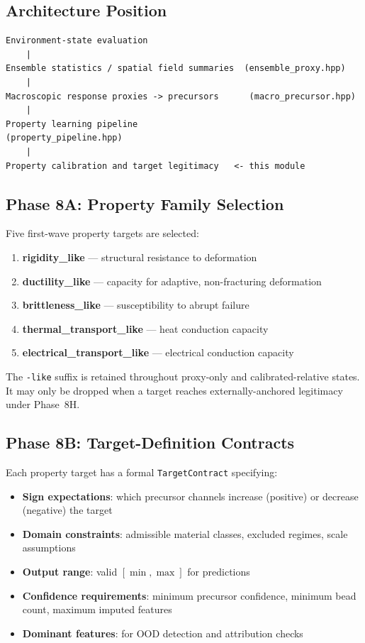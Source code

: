 \documentclass[11pt]{article}
\newcommand{\type}[1]{\texttt{#1}}
\begin{document}
\subsection{Architecture Position}

\begin{verbatim}
Environment-state evaluation
    |
Ensemble statistics / spatial field summaries  (ensemble_proxy.hpp)
    |
Macroscopic response proxies -> precursors      (macro_precursor.hpp)
    |
Property learning pipeline                      (property_pipeline.hpp)
    |
Property calibration and target legitimacy   <- this module
\end{verbatim}

\subsection{Phase 8A: Property Family Selection}

Five first-wave property targets are selected:
\begin{enumerate}
  \item \textbf{rigidity\_like} --- structural resistance to deformation
  \item \textbf{ductility\_like} --- capacity for adaptive, non-fracturing deformation
  \item \textbf{brittleness\_like} --- susceptibility to abrupt failure
  \item \textbf{thermal\_transport\_like} --- heat conduction capacity
  \item \textbf{electrical\_transport\_like} --- electrical conduction capacity
\end{enumerate}

The \texttt{-like} suffix is retained throughout proxy-only and
calibrated-relative states.  It may only be dropped when a target reaches
externally-anchored legitimacy under Phase~8H.

\subsection{Phase 8B: Target-Definition Contracts}

Each property target has a formal \type{TargetContract} specifying:
\begin{itemize}
  \item \textbf{Sign expectations}: which precursor channels increase
        (positive) or decrease (negative) the target
  \item \textbf{Domain constraints}: admissible material classes,
        excluded regimes, scale assumptions
  \item \textbf{Output range}: valid $[\min, \max]$ for predictions
  \item \textbf{Confidence requirements}: minimum precursor confidence,
        minimum bead count, maximum imputed features
  \item \textbf{Dominant features}: for OOD detection and attribution checks
\end{itemize}
\end{document}
